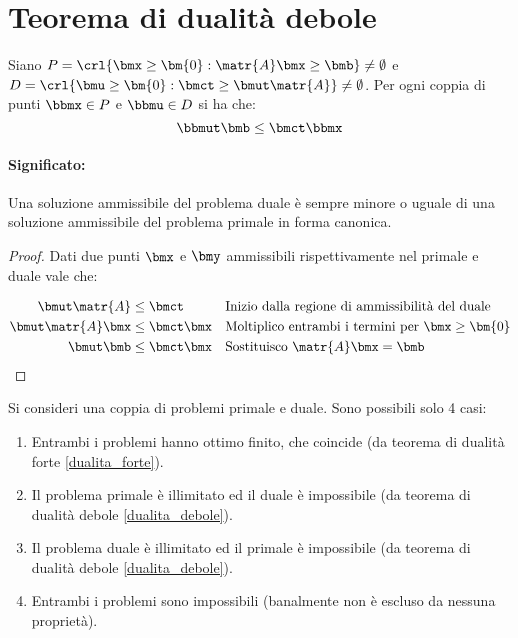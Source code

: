 \documentclass[\main/main.tex]{subfiles}
\begin{document}
\section{Teorema di dualità debole}
\begin{theorem}
  \label{dualita_debole}
  Siano $P=\crl{\bmx \geq \bm{0}: \matr{A}\bmx \geq \bmb} \neq \emptyset$ e $D=\crl{\bmu \geq \bm{0}: \bmct \geq \bmut \matr{A}} \neq \emptyset$. Per ogni coppia di punti $\bbmx \in P$ e $\bbmu \in D$ si ha che:
  \[
    \bbmut \bmb \leq \bmct\bbmx
  \]
  \paragraph*{Significato:} Una soluzione ammissibile del problema duale è sempre minore o uguale di una soluzione ammissibile del problema primale in forma canonica.
\end{theorem}

\begin{proof}
  Dati due punti $\bmx$ e $\bmy$ ammissibili rispettivamente nel primale e duale vale che:

  \begin{align*}
    \bmut \matr{A}     & \leq \bmct     &  & \text{Inizio dalla regione di ammissibilità del duale}      \\
    \bmut \matr{A}\bmx & \leq \bmct\bmx &  & \text{Moltiplico entrambi i termini per $\bmx \geq \bm{0}$} \\
    \bmut \bmb         & \leq \bmct\bmx &  & \text{Sostituisco $\matr{A}\bmx = \bmb$}
  \end{align*}
\end{proof}

\begin{corollary}
  Si consideri una coppia di problemi primale e duale. Sono possibili solo 4 casi:
  \begin{enumerate}
    \item Entrambi i problemi hanno ottimo finito, che coincide (da teorema di dualità forte \ref{dualita_forte}).
    \item Il problema primale è illimitato ed il duale è impossibile (da teorema di dualità debole \ref{dualita_debole}).
    \item Il problema duale è illimitato ed il primale è impossibile (da teorema di dualità debole \ref{dualita_debole}).
    \item Entrambi i problemi sono impossibili (banalmente non è escluso da nessuna proprietà).
  \end{enumerate}
\end{corollary}
\end{document}
